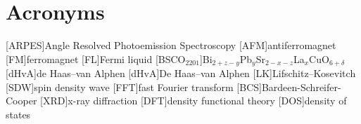 
\section{Acronyms}

\begin{acronym}
    [ARPES]{Angle Resolved Photoemission Spectroscopy}
    [AFM]{antiferromagnet}
    [FM]{ferromagnet}
    [FL]{Fermi liquid}
    [BSCO$_{2201}$]{Bi$_{2+z-y}$Pb$_{y}$Sr$_{2-x-z}$La$_{x}$CuO$_{6+\delta}$}
    [dHvA]{de Haas--van Alphen}
    [dHvA]{De Haas--van Alphen}
    [LK]{Lifschitz--Kosevitch}
    [SDW]{spin density wave}
    [FFT]{fast Fourier transform}
    [BCS]{Bardeen-Schreifer-Cooper}
    [XRD]{x-ray diffraction}
    [DFT]{density functional theory}
    [DOS]{density of states}
\end{acronym}


